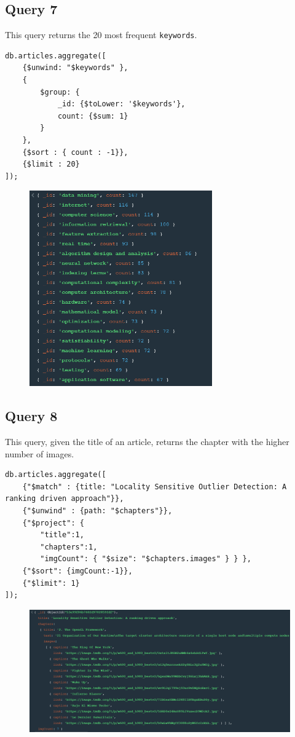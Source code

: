 \documentclass{Configuration_Files/PoliMi3i_thesis}
\begin{document}
\subsection{Query 7}
This query returns the 20 most frequent \verb |keywords|.
\begin{lstlisting}
db.articles.aggregate([
	{$unwind: "$keywords" },
	{
		$group: {
			_id: {$toLower: '$keywords'},
			count: {$sum: 1}
		}
	},
	{$sort : { count : -1}},
	{$limit : 20}
]);
\end{lstlisting}
\begin{figure}[H]
\centering
\includegraphics[width=0.7\textwidth]{query/mongo_q7.PNG}
\label{fig:query7}
\end{figure}

\subsection{Query 8}
This query, given the title of an article, returns the chapter with the higher number of images.
\begin{lstlisting}
db.articles.aggregate([
	{"$match" : {title: "Locality Sensitive Outlier Detection: A ranking driven approach"}},
	{"$unwind" : {path: "$chapters"}},
	{"$project": {
		"title":1,
		"chapters":1,
		"imgCount": { "$size": "$chapters.images" } } },
	{"$sort": {imgCount:-1}},
	{"$limit": 1}
]);
\end{lstlisting}
\begin{figure}[H]
\centering
\includegraphics[width=1\textwidth]{query/mongo_q8.PNG}
\label{fig:query8}
\end{figure}
\end{document}
